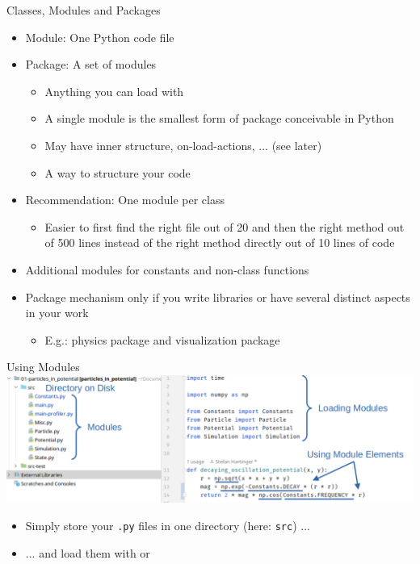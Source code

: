 
\begin{frame}{Classes, Modules and Packages}
%
\begin{itemize}
\item Module: One Python code file
\item Package: A set of modules
	\begin{itemize}
	\item Anything you can load with 
	\item A single module is the smallest form of package conceivable in Python
	\item May have inner structure, on-load-actions, ... (see later)
	\item[\Thus] A way to structure your code
	\end{itemize}
\item Recommendation: One module per class
	\begin{itemize}
	\item Easier to first find the right file out of 20 and then the right method out of 500 lines instead of the right method directly out of 10 lines of code
	\end{itemize}
\item Additional modules for constants and non-class functions
\item Package mechanism only if you write libraries or have several distinct aspects in your work
	\begin{itemize}
	\item E.\;g.: physics package and visualization package
	\end{itemize}
\end{itemize}
%
\end{frame}


\begin{frame}{Using Modules}
%
\includegraphics[width=\linewidth]{./gfx/01-modules}
%
\begin{itemize}
\item Simply store your \texttt{.py} files in one directory (here: \texttt{src}) ...
\item ... and load them with  or 
\end{itemize}
%
\end{frame}

